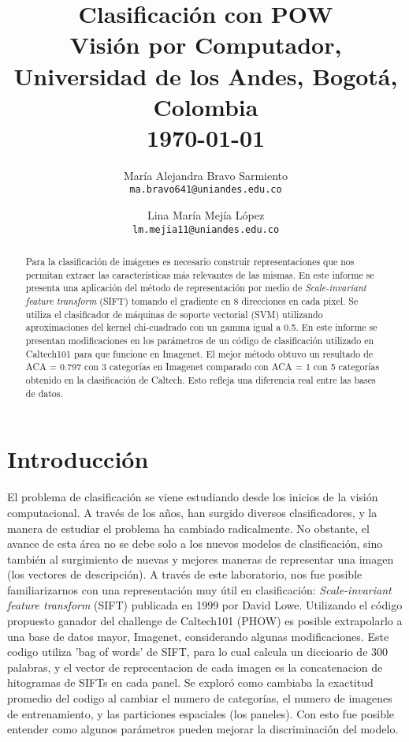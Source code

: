 \documentclass[10pt,twocolumn,letterpaper]{article}
\begin{document}
\title{Clasificación con POW\\
{\small Visión por Computador, Universidad de los Andes, Bogotá, Colombia\\
\today} 
}

\author{María Alejandra Bravo Sarmiento\\
{\tt\small ma.bravo641@uniandes.edu.co}
\and
Lina María Mejía López\\
{\tt\small lm.mejia11@uniandes.edu.co}
}

\maketitle

\begin{abstract}
Para la clasificación de imágenes es necesario construir representaciones que nos permitan extraer las características más relevantes de las mismas. En este informe se presenta una aplicación del método de representación por medio de \textit{Scale-invariant feature transform} (SIFT) tomando el gradiente en 8 direcciones en cada pixel. Se utiliza el clasificador de máquinas de soporte vectorial (SVM) utilizando aproximaciones del kernel chi-cuadrado con un gamma igual a 0.5. En este informe se presentan modificaciones en los parámetros de un código de clasificación utilizado en Caltech101 para que funcione en Imagenet. El mejor método obtuvo un resultado de ACA = 0.797 con 3 categorías en Imagenet comparado con ACA = 1 con 5 categorías obtenido en la clasificación de Caltech. Esto refleja una diferencia real entre las bases de datos.
\end{abstract}

\section{Introducción}
El problema de clasificación se viene estudiando desde los inicios de la visión computacional. A través de los años, han surgido diversos clasificadores, y la manera de estudiar el problema ha cambiado radicalmente. No obstante, el avance de esta área no se debe solo a los nuevos modelos de clasificación, sino también al surgimiento de nuevas y mejores maneras de representar una imagen (los vectores de descripción). A través de este laboratorio, nos fue posible familiarizarnos con una representación muy útil en clasificación: \textit{Scale-invariant feature transform} (SIFT) publicada en 1999 por David Lowe. Utilizando el código propuesto ganador del challenge de Caltech101 (PHOW) es posible extrapolarlo a una base de datos mayor, Imagenet, considerando algunas modificaciones. Este codigo utiliza 'bag of words' de SIFT, para lo cual calcula un diccioario de 300 palabras, y el vector de reprecentacion de cada imagen es la concatenacion de hitogramas de SIFTs en cada panel. Se exploró como cambiaba la exactitud promedio del codigo al cambiar el numero de categorías, el numero de imagenes de entrenamiento, y las particiones espaciales (los paneles). Con esto fue posible entender como algunos parámetros pueden mejorar la discriminación del modelo. 
\end{document}
